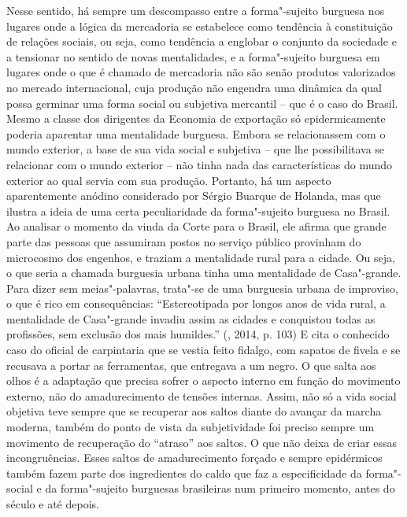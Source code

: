 Nesse sentido, há sempre um descompasso entre a forma"-sujeito burguesa
nos lugares onde a lógica da mercadoria se estabelece como tendência à
constituição de relações sociais, ou seja, como tendência a englobar o
conjunto da sociedade e a tensionar no sentido de novas mentalidades, e
a forma"-sujeito burguesa em lugares onde o que é chamado de mercadoria
não são senão produtos valorizados no mercado internacional, cuja
produção não engendra uma dinâmica da qual possa germinar uma forma
social ou subjetiva mercantil -- que é o caso do Brasil. Mesmo a classe
dos dirigentes da Economia de exportação só epidermicamente poderia
aparentar uma mentalidade burguesa. Embora se relacionassem com o mundo
exterior, a base de sua vida social e subjetiva -- que lhe possibilitava
se relacionar com o mundo exterior -- não tinha nada das características
do mundo exterior ao qual servia com sua produção. Portanto, há um
aspecto aparentemente anódino considerado por Sérgio Buarque de Holanda,
mas que ilustra a ideia de uma certa peculiaridade da forma"-sujeito
burguesa no Brasil. Ao analisar o momento da vinda da Corte para o
Brasil, ele afirma que grande parte das pessoas que assumiram postos no
serviço público provinham do microcosmo dos engenhos, e traziam a
mentalidade rural para a cidade. Ou seja, o que seria a chamada
burguesia urbana tinha uma mentalidade de Casa"-grande. Para dizer sem
meias"-palavras, trata"-se de uma burguesia urbana de improviso, o que é
rico em consequências: ``Estereotipada por longos anos de vida rural, a
mentalidade de Casa"-grande invadiu assim as cidades e conquistou todas
as profissões, sem exclusão dos mais humildes.'' (, 2014, p. 103)
E cita o conhecido caso do oficial de carpintaria que se vestia feito
fidalgo, com sapatos de fivela e se recusava a portar as ferramentas,
que entregava a um negro. O que salta aos olhos é a adaptação que
precisa sofrer o aspecto interno em função do movimento externo, não do
amadurecimento de tensões internas. Assim, não só a vida social objetiva
teve sempre que se recuperar aos saltos diante do avançar da marcha
moderna, também do ponto de vista da subjetividade foi preciso sempre um
movimento de recuperação do ``atraso'' aos saltos. O que não deixa de
criar essas incongruências. Esses saltos de amadurecimento forçado e
sempre epidérmicos também fazem parte dos ingredientes do caldo que faz
a especificidade da forma"-social e da forma"-sujeito burguesas
brasileiras num primeiro momento, antes do século  e até depois.

